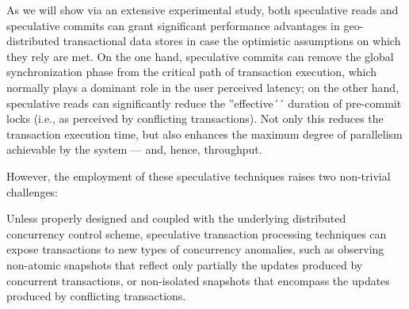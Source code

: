 As we will  show via an extensive experimental study, both speculative reads and speculative commits can grant significant performance advantages in geo-distributed transactional data stores in case the optimistic assumptions on which they rely are met. On the one hand, speculative commits can remove the global synchronization phase from the critical path of transaction execution, which normally plays a dominant role in the user perceived latency; 
on the other hand, speculative reads can significantly reduce the ''effective´´ duration of pre-commit locks (i.e., as perceived by conflicting transactions). Not only this reduces the transaction execution time, but also enhances the maximum degree of parallelism achievable by the system --- and, hence, throughput.

However, the employment of these speculative techniques raises two non-trivial challenges:

\vspace{4pt} Unless properly designed and coupled with the underlying distributed concurrency control scheme, speculative transaction processing techniques can expose transactions to new types of concurrency anomalies, such as 
observing non-atomic snapshots that reflect only partially the updates produced by concurrent transactions, or non-isolated snapshots that encompass the updates produced by conflicting transactions. 



